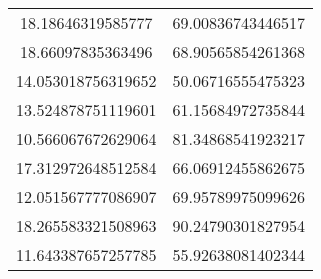 \begin{table}
\begin{tabular}{cc}
18.18646319585777 & 69.00836743446517 \\
18.66097835363496 & 68.90565854261368 \\
14.053018756319652 & 50.06716555475323 \\
13.524878751119601 & 61.15684972735844 \\
10.566067672629064 & 81.34868541923217 \\
17.312972648512584 & 66.06912455862675 \\
12.051567777086907 & 69.95789975099626 \\
18.265583321508963 & 90.24790301827954 \\
11.643387657257785 & 55.92638081402344 \\
\end{tabular}
\end{table}
